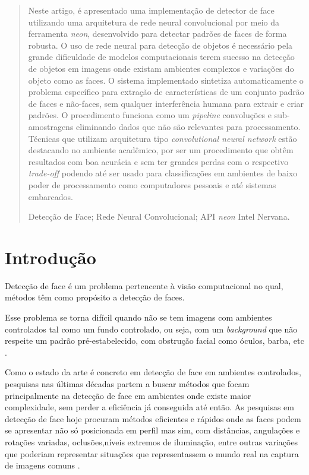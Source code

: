 \documentclass[10pt, conference]{IEEEtran}
\begin{document}
\begin{abstract}
	Neste artigo, é apresentado uma implementação de detector de face utilizando uma arquitetura de rede neural convolucional por meio da ferramenta \textit{neon}, desenvolvido para detectar padrões de faces de forma robusta. O uso de rede neural para detecção de objetos é necessário pela grande dificuldade de modelos computacionais terem sucesso na detecção de objetos em imagens onde existam ambientes complexos e variações do objeto como as faces. O sistema implementado sintetiza automaticamente o problema específico para extração de características de um conjunto padrão de faces e não-faces, sem qualquer interferência humana para extrair e criar padrões. O procedimento funciona como um \textit{pipeline} convoluções e sub-amostragens eliminando dados que não são relevantes para processamento. Técnicas que utilizam arquitetura tipo \textit{convolutional neural network} estão destacando no ambiente acadêmico, por ser um procedimento que obtêm resultados com boa acurácia e sem ter grandes perdas com o respectivo \textit{trade-off} podendo até ser usado para classificações em ambientes de baixo poder de processamento como computadores pessoais e até sistemas embarcados.
	
	\begin{IEEEkeywords}
		Detecção de Face; Rede Neural Convolucional; API \textit{neon} Intel Nervana.
	\end{IEEEkeywords}
\end{abstract}



\IEEEpeerreviewmaketitle


\section{Introdução}
	Detecção de face é um problema pertencente à visão computacional no qual, métodos têm como propósito a detecção de faces.

	Esse problema se torna difícil quando não se tem imagens com ambientes controlados tal como um fundo controlado, ou seja, com um \textit{background} que não respeite um padrão pré-estabelecido, com obstrução facial como óculos, barba, etc \cite{Garcia2004}.

	Como o estado da arte é concreto em detecção de face em ambientes controlados, pesquisas nas últimas décadas partem a buscar métodos que focam principalmente na detecção de face em ambientes onde existe maior complexidade, sem perder a eficiência já conseguida até então. As pesquisas em detecção de face hoje procuram métodos eficientes e rápidos onde as faces podem se apresentar não só posicionada em perfil mas sim, com distâncias, angulações e rotações variadas, oclusões,níveis extremos de iluminação, entre outras variações que poderiam representar situações que representassem o mundo real na captura de imagens comuns \cite{Haoxiang2015}.
\end{document}
